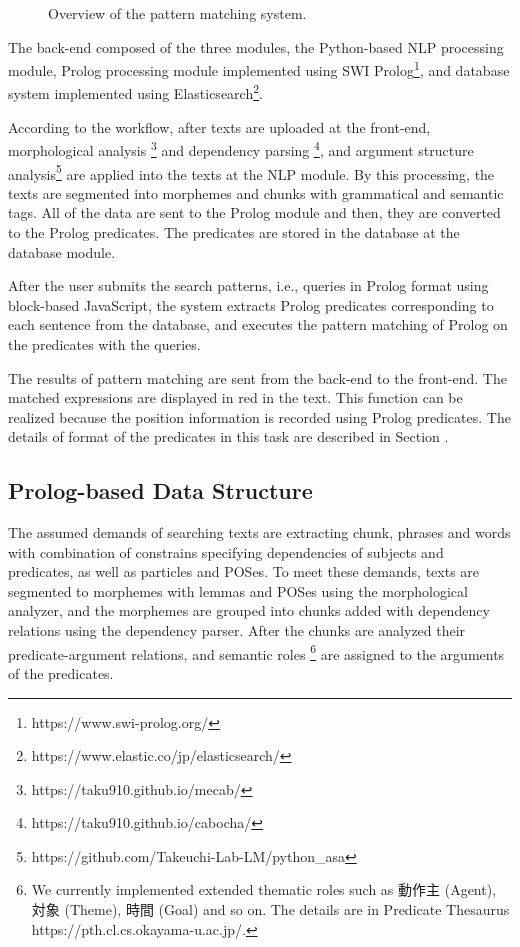 \documentclass[conference]{IEEEtran}
\begin{document}
\begin{figure}[htbp]
\caption{Overview of the pattern matching system.}
\label{fig:sys}
\end{figure}

The back-end composed of the three modules, the Python-based NLP processing module,
Prolog processing module implemented using SWI Prolog\footnote{https://www.swi-prolog.org/},
and database system implemented using Elasticsearch\footnote{https://www.elastic.co/jp/elasticsearch/}.

According to the workflow, after texts are uploaded at the front-end,
morphological analysis \footnote{https://taku910.github.io/mecab/} and
dependency parsing \footnote{https://taku910.github.io/cabocha/}, and
argument structure analysis\footnote{https://github.com/Takeuchi-Lab-LM/python\_asa}
\cite{take2011f} are applied into the texts at the NLP module.
By this processing, the texts are segmented into morphemes and
chunks with grammatical and semantic tags. 
All of the data are sent to the Prolog module and then, they are converted
to the Prolog predicates. The predicates are stored in the database at the database module.

After the user submits the search patterns, i.e., queries in Prolog format using block-based JavaScript,
the system extracts Prolog predicates corresponding to each sentence from the database, and executes the
pattern matching of Prolog on the predicates with the queries. 

The results of pattern matching are sent from the back-end to the front-end.
The matched expressions are displayed in red in the text.
This function can be realized because the position information is recorded 
using Prolog predicates. The details of format of the predicates
in this task are described in Section \label{sec:prolog}. 


\subsection{Prolog-based Data Structure} 
\label{sec:prolog}
The assumed demands of searching texts are extracting chunk, phrases and words with 
combination of constrains specifying dependencies of subjects and predicates, as well as particles and POSes.
To meet these demands, texts are segmented to morphemes with lemmas and POSes using the morphological analyzer, and
the morphemes are grouped into chunks added with dependency relations using the dependency parser.
After the chunks are analyzed their predicate-argument relations, and semantic roles \footnote{We
currently implemented extended thematic roles\cite{fillmore68,take2011f} such as 動作主 (Agent), 対象 (Theme), 時間 (Goal) and so on. The details are in Predicate Thesaurus https://pth.cl.cs.okayama-u.ac.jp/. } are assigned to the arguments of the predicates. 
\end{document}
